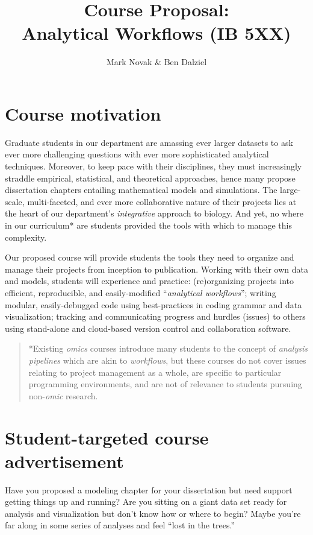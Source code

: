 \documentclass[10pt]{article}
\author{Mark Novak \& Ben Dalziel}
\title{Course Proposal:\\Analytical Workflows (IB 5XX)}
\begin{document}
\maketitle
\date{}

\section*{Course motivation}
Graduate students in our department are amassing ever larger datasets to ask ever more challenging questions with ever more sophisticated analytical techniques.   Moreover, to keep pace with their disciplines, they must increasingly straddle empirical, statistical, and theoretical approaches, hence many propose dissertation chapters entailing mathematical models and simulations.  The large-scale, multi-faceted, and ever more collaborative nature of their projects lies at the heart of our department's \emph{integrative} approach to biology.  And yet, no where in our curriculum* are students provided the tools with which to manage this complexity.

Our proposed course will provide students the tools they need to organize and manage their projects from inception to publication.  Working with their own data and models, students will experience and practice: (re)organizing projects into efficient, reproducible, and easily-modified ``\emph{analytical workflows}''; writing modular, easily-debugged code using best-practices in coding grammar and data visualization; tracking and communicating progress and hurdles (issues) to others using stand-alone and cloud-based version control and collaboration software.

\begin{quote}
	*Existing \emph{omics} courses introduce many students to the concept of \emph{analysis pipelines} which are akin to \emph{workflows}, but these courses do not cover issues relating to project management as a whole, are specific to particular programming environments, and are not of relevance to students pursuing non-\emph{omic} research.
\end{quote}


\section*{Student-targeted course advertisement}
Have you proposed a modeling chapter for your dissertation but need support getting things up and running?  Are you sitting on a giant data set ready for analysis and visualization but don't know how or where to begin?  Maybe you're far along in some series of analyses and feel ``lost in the trees.''
\end{document}
